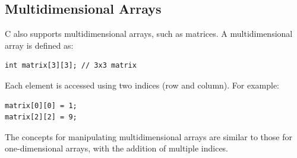 \subsection{Multidimensional Arrays}
C also supports multidimensional arrays, such as matrices. A multidimensional array is defined as:
\begin{lstlisting}
int matrix[3][3]; // 3x3 matrix
\end{lstlisting}

Each element is accessed using two indices (row and column). For example:
\begin{lstlisting}
matrix[0][0] = 1;
matrix[2][2] = 9;
\end{lstlisting}

The concepts for manipulating multidimensional arrays are similar to those for one-dimensional arrays, with the addition of multiple indices.
